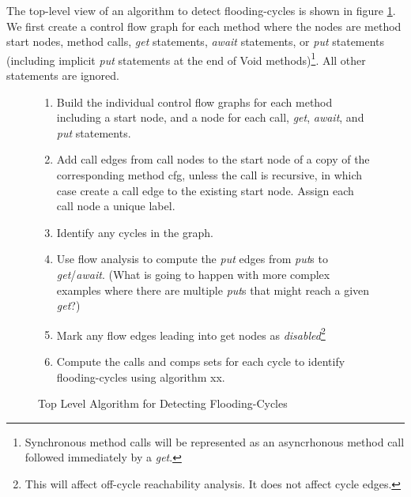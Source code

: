 \documentclass[12pt]{article}%
\begin{document}

The top-level view of an algorithm to detect flooding-cycles is shown in figure \ref{flow-analysis}.
We first create a control flow graph for each method where the nodes are method start nodes, method calls, \emph{get} statements, 
\emph{await} statements,
or \emph{put} statements (including implicit \emph{put} statements at the end of Void methods)\footnote{
Synchronous method calls will be represented as an asyncrhonous method call followed immediately by a \emph{get}.}.
All other statements are ignored. 

\begin{figure}
\begin{shaded}
\begin{enumerate}
\item Build the individual control flow graphs for each method including a start node, and a node for each call, \emph{get}, \emph{await}, 
and \emph{put} statements.
\item Add call edges from call nodes to the start node of a copy of the corresponding method cfg, unless the call is recursive, in which case
create a call edge to the existing start node. Assign each call node a unique label.
\item Identify any cycles in the graph.
\item Use flow analysis to compute the \emph{put} edges from \emph{put}s to \emph{get}/\emph{await}. (What is going to happen with more complex examples
where there are multiple \emph{put}s that might reach a given \emph{get}?)
\item Mark any flow edges leading into get nodes as \emph{disabled}\footnote{This will affect off-cycle reachability analysis. 
It does not affect cycle edges.}
\item Compute the calls and comps sets for each cycle to identify flooding-cycles using algorithm xx.
\end{enumerate}\end{shaded}%
\caption{\label{flow-analysis}
Top Level Algorithm for Detecting Flooding-Cycles}
\end{figure}
\end{document}
